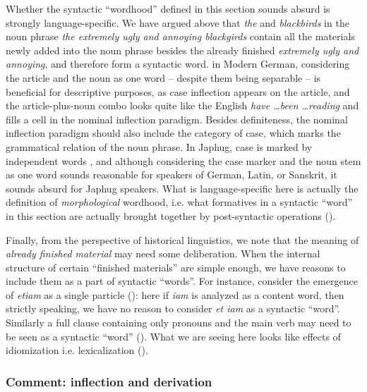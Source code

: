 \documentclass[a4paper, oneside, scheme=plain, 12pt]{article}
\newcommand*{\citepage}[1]{p.~{#1}}
\newcommand*{\term}[1]{\emph{#1}}
\newcommand{\form}[1]{\emph{#1}}
\begin{document}
Whether the syntactic ``wordhood'' defined in this section sounds absurd is strongly language-specific.
We have argued above that \form{the} and \form{blackbirds}
in the noun phrase \form{the extremely ugly and annoying blackgirds}
contain all the materials newly added into the noun phrase
besides the already finished \form{extremely ugly and annoying},
and therefore form a syntactic word.
in Modern German, considering the article and the noun as one word
-- despite them being separable -- is beneficial for descriptive purposes,
as case inflection appears on the article,
and the article-plus-noun combo looks quite like the English \form{have \dots been \dots reading}
and fills a cell in the nominal inflection paradigm.
Besides definiteness, the nominal inflection paradigm should also include the category of case,
which marks the grammatical relation of the noun phrase.
In Japhug, case is marked by independent words \citep[\citepage{8.2.1}]{jacques2021grammar},
and although considering the case marker and the noun stem as one word sounds reasonable for
speakers of German, Latin, or Sanskrit,
it sounds absurd for Japhug speakers.
What is language-specific here is actually the definition of 
\emph{morphological} wordhood, i.e. what formatives in a syntactic ``word'' in this section
are actually brought together by post-syntactic operations ().

Finally, from the perspective of historical linguistics,
we note that the meaning of \term{already finished material} may need some deliberation.
When the internal structure of certain ``finished materials'' are simple enough,
we have reasons to include them as a part of syntactic ``words''.
For instance, consider the emergence of \form{etiam} as a single particle
():
here if \form{iam} is analyzed as a content word,
then strictly speaking, we have no reason to consider \form{et iam} as a syntactic ``word''.
Similarly a full clause containing only pronouns and the main verb may need to be seen as a syntactic ``word'' ().
What we are seeing here looks like effects of idiomization i.e. lexicalization
().

\subsubsection{Comment: inflection and derivation}\label{sec:inflection-derivation}
\end{document}
